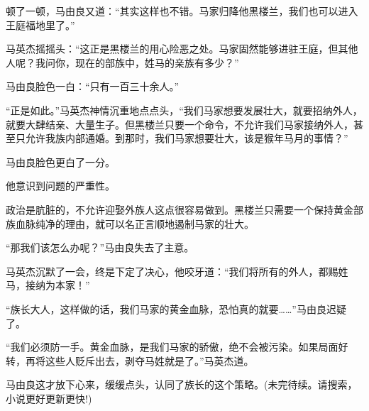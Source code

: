 \begin{this_body}
顿了一顿，马由良又道：“其实这样也不错。马家归降他黑楼兰，我们也可以进入王庭福地里了。”

马英杰摇摇头：“这正是黑楼兰的用心险恶之处。马家固然能够进驻王庭，但其他人呢？我问你，现在的部族中，姓马的亲族有多少？”

马由良脸色一白：“只有一百三十余人。”

“正是如此。”马英杰神情沉重地点点头，“我们马家想要发展壮大，就要招纳外人，就要大肆结亲、大量生子。但黑楼兰只要一个命令，不允许我们马家接纳外人，甚至只允许我族内部通婚。到那时，我们马家想要壮大，该是猴年马月的事情？”

马由良脸色更白了一分。

他意识到问题的严重性。

政治是肮脏的，不允许迎娶外族人这点很容易做到。黑楼兰只需要一个保持黄金部族血脉纯净的理由，就可以名正言顺地遏制马家的壮大。

“那我们该怎么办呢？”马由良失去了主意。

马英杰沉默了一会，终是下定了决心，他咬牙道：“我们将所有的外人，都赐姓马，接纳为本家！”

“族长大人，这样做的话，我们马家的黄金血脉，恐怕真的就要……”马由良迟疑了。

“我们必须防一手。黄金血脉，是我们马家的骄傲，绝不会被污染。如果局面好转，再将这些人贬斥出去，剥夺马姓就是了。”马英杰道。

马由良这才放下心来，缓缓点头，认同了族长的这个策略。(未完待续。请搜索，小说更好更新更快!)

\end{this_body}

